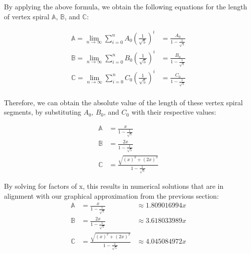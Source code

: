 \noindent
By applying the above formula, we obtain the following equations for the length of vertex spiral $\mathbb{A}$, $\mathbb{B}$, and $\mathbb{C}$:

\begin{equation}
    \begin{aligned}
        \mathbb{A} = \lim_{n \to \infty} \sum_{i=0}^{n} A_0\left(\frac{1}{\sqrt{5}}\right)^i &=\frac{A_0}{1-\frac{1}{\sqrt{5}}} \\
        \mathbb{B} = \lim_{n \to \infty} \sum_{i=0}^{n} B_0\left(\frac{1}{\sqrt{5}}\right)^i &=\frac{B_0}{1-\frac{1}{\sqrt{5}}} \\
        \mathbb{C} = \lim_{n \to \infty} \sum_{i=0}^{n} C_0\left(\frac{1}{\sqrt{5}}\right)^i &=\frac{C_0}{1-\frac{1}{\sqrt{5}}} \\
    \end{aligned}
\end{equation}

\noindent
Therefore, we can obtain the absolute value of the length of these vertex spiral segments, by substituting $A_0$, $B_0$, and $C_0$ with their respective values:

\begin{equation}
    \begin{aligned}
        \mathbb{A} &=\frac{x}{1-\frac{1}{\sqrt{5}}} \\
        \mathbb{B} &=\frac{2x}{1-\frac{1}{\sqrt{5}}} \\
        \mathbb{C} &=\frac{\sqrt{(x)^2 + (2x)^2}}{1-\frac{1}{\sqrt{5}}}
    \end{aligned}
\end{equation}

\noindent
By solving for factors of x, this results in numerical solutions that are in alignment with our graphical approximation from the previous section:
\begin{equation}
    \begin{aligned}
        \mathbb{A} &=\frac{x}{1-\frac{1}{\sqrt{5}}} &\approx 1.809016994x\\
        \mathbb{B} &=\frac{2x}{1-\frac{1}{\sqrt{5}}} &\approx 3.618033989x\\
        \mathbb{C} &=\frac{\sqrt{(x)^2 + (2x)^2}}{1-\frac{1}{\sqrt{5}}} &\approx 4.045084972x
    \end{aligned}
\end{equation}
